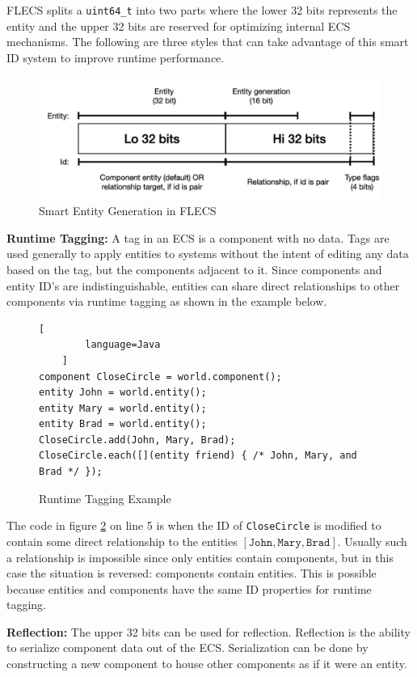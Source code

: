 FLECS splits a \texttt{uint64\_t} into two parts where the lower 32 bits represents the entity and the upper 32 bits are reserved for optimizing internal ECS mechanisms. The following are three styles that can take advantage of this smart ID system to improve runtime performance.

\begin{figure}[H]
    \centering
    \includegraphics[width=0.5\linewidth]{resources/entity_generation.png}
    \caption{Smart Entity Generation in FLECS}
    \label{fig:entity_generation}
\end{figure}

\textbf{Runtime Tagging:}
A tag in an ECS is a component with no data. Tags are used generally to apply entities to systems without the intent of editing any data based on the tag, but the components adjacent to it. Since components and entity ID's are indistinguishable, entities can share direct relationships to other components via runtime tagging as shown in the example below. \cite{RomeoPHD}

\begin{figure}[H]
    \begin{lstlisting}[
        language=Java
    ]
component CloseCircle = world.component();
entity John = world.entity();
entity Mary = world.entity();
entity Brad = world.entity();
CloseCircle.add(John, Mary, Brad);
CloseCircle.each([](entity friend) { /* John, Mary, and Brad */ });
\end{lstlisting}
    \caption{Runtime Tagging Example}
    \label{code:runtime_tagging}
\end{figure}

The code in figure \ref{code:runtime_tagging} on line 5 is when the ID of \texttt{CloseCircle} is modified to contain some direct relationship to the entities $[\texttt{John}, \texttt{Mary}, \texttt{Brad}]$. Usually such a relationship is impossible since only entities contain components, but in this case the situation is reversed: components contain entities. This is possible because entities and components have the same ID properties for runtime tagging.

\textbf{Reflection:}
The upper 32 bits can be used for reflection. Reflection is the ability to serialize component data out of the ECS. Serialization can be done by constructing a new component to house other components as if it were an entity.

